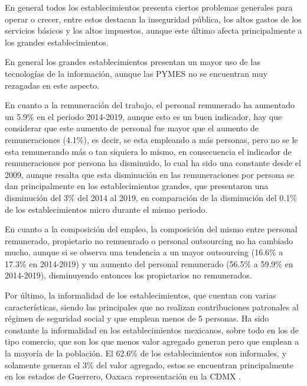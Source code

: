 En general todos los establecimientos presenta ciertos problemas generales para operar o crecer, entre estos destacan la inseguridad pública, los altos gastos de los servicios básicos y los altos impuestos, aunque este último afecta principalmente a los grandes establecimientos. 

En general los grandes establecimientos presentan un mayor uso de las tecnologías de la información, aunque las PYMES no se encuentran muy rezagadas en este aspecto.

En cuanto a la remuneración del trabajo, el personal remunerado ha aumentado un 5.9\% en el periodo 2014-2019, aunque esto es un buen indicador, hay que considerar que este aumento de personal fue mayor que el aumento de remuneraciones (4.1\%), es decir, se esta empleando a más personas, pero no se le esta remunerando más o tan siquiera lo mismo, en consecuencia el indicador de remuneraciones por persona ha disminuido, lo cual ha sido una constante desde el 2009, aunque resalta que esta disminución en las remuneraciones por persona se dan principalmente en los establecimientos grandes, que presentaron una disminución del 3\% del 2014 al 2019, en comparación de la disminución del 0.1\% de los establecimientos micro durante el mismo periodo.

En cuanto a la composición del empleo, la composición del mismo entre personal remunerado, propietario no remuenrado o personal outsourcing no ha cambiado mucho, aunque si se observa una tendencia a un mayor outsourcing (16.6\% a 17.3\% en 2014-2019) y un aumento del personal remunerado (56.5\% a 59.9\% en 2014-2019), disminuyendo entonces los propietarios no remunerados.

Por último, la informalidad de los establecimientos, que cuentan con varias características, siendo las principales que no realizan contribuciones patronales al régimen de seguridad social y que emplean menos de 5 personas. Ha sido constante la informalidad en los establecimientos mexicanos, sobre todo en los de tipo comercio, que son los que menos valor agregado generan pero que emplean a la mayoría de la población. El 62.6\% de los establecimientos son informales, y solamente generan el 3\% del valor agregado, estos se encuentran principalmente en los estados de Guerrero, Oaxaca representación en la CDMX \cite{Censo2019}.
